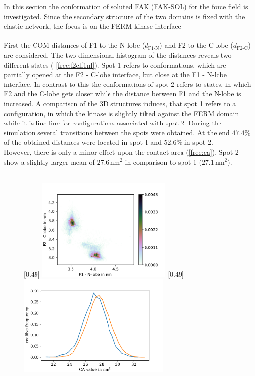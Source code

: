 \label{sec:fak_sol}
In this section the conformation of soluted FAK (FAK-SOL) for the \martini force field is investigated. Since the secondary structure of the two domains is fixed with the elastic network, the focus is on the FERM kinase interface.\\
\\
First the COM distances of F1 to the N-lobe ($d_\text{F1-N}$) and F2 to the C-lobe ($d_\text{F2-C}$) are considered. The two dimensional histogram of the distances reveals two different states ( \autoref{free:f2clf1nl}). Spot 1 refers to conformations, which are partially opened at the F2 - C-lobe interface, but close at the F1 - N-lobe interface. In contrast to this the conformations of spot 2 refers to states, in which F2 and the C-lobe gets closer while the distance between F1 and the N-lobe is increased. A comparison of the 3D structures induces, that spot 1 refers to a configuration, in which the kinase is slightly tilted against the FERM domain while it is line line for configurations associated with spot 2. During the simulation several transitions between the spots were obtained. At the end $47.4\%$ of the obtained distances were located in spot 1 and $52.6\%$ in spot 2.\\
However, there is only a minor effect upon the contact area (\autoref{free:ca}).  Spot 2 show a slightly larger mean of $27.6\,\si{\nano\metre}^2$ in comparison to spot 1 ($27.1\,\si{\nano\metre}^2$).\\
\\
%
%
%
\begin{figure}
	\subcaptionbox{\label{free:f2clf1nl}}[0.49\textwidth]{
		\includegraphics[height=5cm]{figures/results/free_f1f2}
	}\hfill%
	\subcaptionbox{\label{free:ca}}[0.49\textwidth]{
		\includegraphics[height=5cm]{figures/results/free_ca}
	}%
\end{figure}
